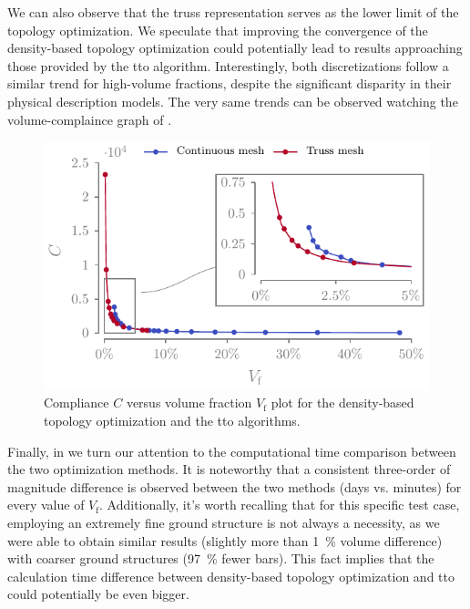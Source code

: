 We can also observe that the truss representation serves as the lower limit of the topology optimization. We speculate that improving the convergence of the density-based topology optimization could potentially lead to results approaching those provided by the \gls{tto} algorithm. Interestingly, both discretizations follow a similar trend for high-volume fractions, despite the significant disparity in their physical description models. The very same trends can be observed watching the volume-complaince graph of .
\begin{figure}
    \centering
    \includegraphics{figures/03_comparison_TO_TTO/16_comp_vol/comp_vol.pdf}
    \caption{Compliance $C$ versus volume fraction $V_\text{f}$ plot for the density-based topology optimization and the \gls{tto} algorithms.}
    \label{fig:03_comp_vol}
\end{figure}

Finally, in  we turn our attention to the computational time comparison between the two optimization methods. It is noteworthy that a consistent three-order of magnitude difference is observed between the two methods (days vs. minutes) for every value of $V_\text{f}$. Additionally, it's worth recalling that for this specific test case, employing an extremely fine ground structure is not always a necessity, as we were able to obtain similar results (slightly more than \qty{1}{\percent} volume difference) with coarser ground structures (\qty{97}{\percent} fewer bars). This fact implies that the calculation time difference between density-based topology optimization and \gls{tto} could potentially be even bigger.

